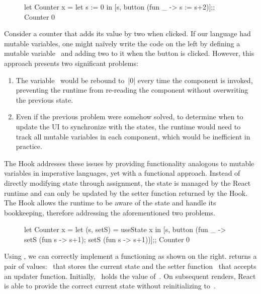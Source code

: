 \begin{figure}
  \vspace*{-\intextsep}
  \begin{reactcode}
let Counter x =
  let s := 0 in
  [s, button (fun _ -> s := s+2)];;
Counter 0
  \end{reactcode}
\end{figure}
\noindent Consider a counter that adds its value by two when clicked.
If our language had mutable variables, one might na\"ively write the code on the left by defining a mutable variable~ and adding two to it when the button is clicked.
However, this approach presents two significant problems:
\begin{enumerate}
  \item The variable~ would be rebound to~|0| every time the component is invoked, preventing the runtime from re-reading the component without overwriting the previous state.
  \item Even if the previous problem were somehow solved, to determine when to update the UI to synchronize with the states, the runtime would need to track all mutable variables in each component, which would be inefficient in practice.
\end{enumerate}

The  Hook addresses these issues by providing functionality analogous to mutable variables in imperative languages, yet with a functional approach.
Instead of directly modifying state through assignment, the state is managed by the React runtime and can only be updated by the setter function returned by the Hook.
The  Hook allows the runtime to be aware of the state and handle its bookkeeping, therefore addressing the aforementioned two problems.

\begin{figure}
  \vspace*{-1.1\intextsep}
  \begin{reactcode}
let Counter x =
  let (s, setS) = useState x in
  [s, button (fun _ ->
    setS (fun s -> s+1);
    setS (fun s -> s+1))];;
Counter 0
  \end{reactcode}
\end{figure}
Using , we can correctly implement a functioning  as shown on the right.
 returns a pair of values: ~that stores the current state and the setter function~ that accepts an updater function.
Initially, ~holds the value of~.
On subsequent renders, React is able to provide the correct current state without reinitializing to~.

